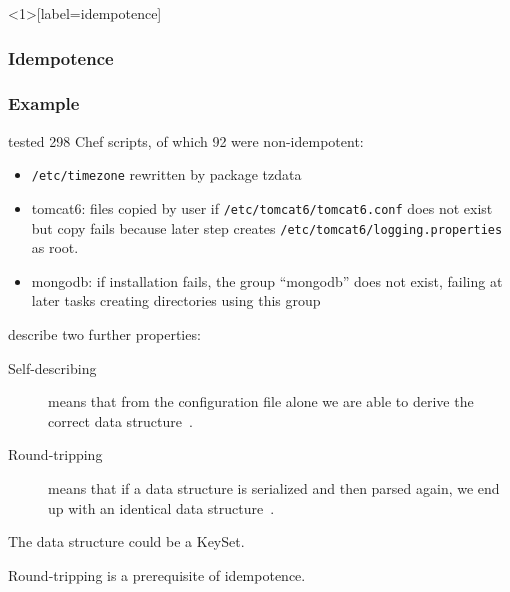 \begin{frame}<1>[label=idempotence]
	\frametitle{Idempotence}


\end{frame}

\begin{frame}
	\frametitle{Example}
	\citet{waldemar2013testing} tested 298 Chef scripts, of which 92 were non-idempotent:

	\begin{itemize}[<+-| alert@+>]
	\item \texttt{/etc/timezone} rewritten by package tzdata
	\item tomcat6: files copied by user if \texttt{/etc/tomcat6/tomcat6.conf} does not exist but copy fails because later step creates \texttt{/etc/tomcat6/logging.properties} as root.
	\item mongodb: if installation fails, the group ``mongodb'' does not exist, failing at later tasks creating directories using this group
	\end{itemize}
\end{frame}

\begin{frame}
	\citet{wadler2003xml} describe two further properties:
	\vspace{2em}

	\begin{description}
	\item[Self-describing]
	means that from the configuration file alone we are able to derive the correct data structure~\cite{wadler2003xml}.

	\item[Round-tripping]
	means that if a data structure is serialized and then parsed again, we end up with an identical data structure~\cite{wadler2003xml}.
	\end{description}

	The data structure could be a KeySet.

	\pause

	\vspace{2em}
	Round-tripping is a prerequisite of idempotence.
\end{frame}


